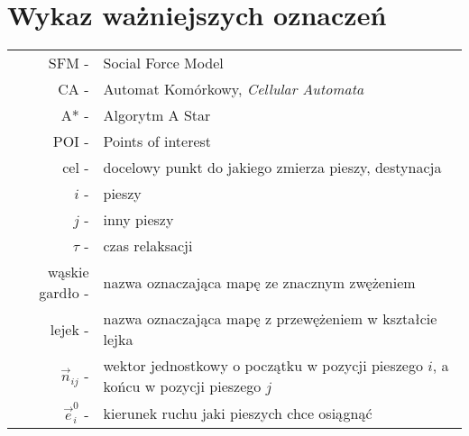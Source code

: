\chapter{Wykaz ważniejszych oznaczeń}
\label{sec:wykazOznaczen}

\begin{center}

\begin{tabular}{rl}
SFM - & Social Force Model \\ 
CA - & Automat Komórkowy, \textit{Cellular Automata} \\ 
A* - & Algorytm A Star \\ 
POI - & Points of interest \\ 
cel - & docelowy punkt do jakiego zmierza pieszy, destynacja \\ 
$i$ - & pieszy \\
$j$ - & inny pieszy \\ 
$\tau$ - & czas relaksacji \\ 
wąskie gardło - & nazwa oznaczająca mapę ze znacznym zwężeniem \\ 
lejek - & nazwa oznaczająca mapę z przewężeniem w kształcie lejka  \\ 
$\vec{n}_{ij}$ - & wektor jednostkowy o początku w pozycji pieszego $i$, a końcu w pozycji pieszego $j$ \\
$\vec{e}^{0}_{i}$ - & kierunek ruchu jaki pieszych chce osiągnąć \\
\end{tabular} 

\end{center}
















